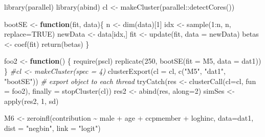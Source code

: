 \documentclass[
]{ctexart}
\newenvironment{Shaded}{\begin{snugshade}}{\end{snugshade}}
\newcommand{\AttributeTok}[1]{\textcolor[rgb]{0.77,0.63,0.00}{#1}}
\newcommand{\CommentTok}[1]{\textcolor[rgb]{0.56,0.35,0.01}{\textit{#1}}}
\newcommand{\ConstantTok}[1]{\textcolor[rgb]{0.00,0.00,0.00}{#1}}
\newcommand{\ControlFlowTok}[1]{\textcolor[rgb]{0.13,0.29,0.53}{\textbf{#1}}}
\newcommand{\DecValTok}[1]{\textcolor[rgb]{0.00,0.00,0.81}{#1}}
\newcommand{\FunctionTok}[1]{\textcolor[rgb]{0.00,0.00,0.00}{#1}}
\newcommand{\NormalTok}[1]{#1}
\newcommand{\OtherTok}[1]{\textcolor[rgb]{0.56,0.35,0.01}{#1}}
\newcommand{\SpecialCharTok}[1]{\textcolor[rgb]{0.00,0.00,0.00}{#1}}
\newcommand{\StringTok}[1]{\textcolor[rgb]{0.31,0.60,0.02}{#1}}
\begin{document}
\begin{Shaded}
\begin{Highlighting}[]
\FunctionTok{library}\NormalTok{(parallel)}
\FunctionTok{library}\NormalTok{(abind)}
\NormalTok{cl }\OtherTok{\textless{}{-}} \FunctionTok{makeCluster}\NormalTok{(parallel}\SpecialCharTok{::}\FunctionTok{detectCores}\NormalTok{())}

\NormalTok{bootSE }\OtherTok{\textless{}{-}} \ControlFlowTok{function}\NormalTok{(fit, data)\{}
\NormalTok{    n }\OtherTok{\textless{}{-}} \FunctionTok{dim}\NormalTok{(data)[}\DecValTok{1}\NormalTok{]}
\NormalTok{    idx }\OtherTok{\textless{}{-}} \FunctionTok{sample}\NormalTok{(}\DecValTok{1}\SpecialCharTok{:}\NormalTok{n, n, }\AttributeTok{replace=}\ConstantTok{TRUE}\NormalTok{)}
\NormalTok{    newData }\OtherTok{\textless{}{-}}\NormalTok{ data[idx,]}
\NormalTok{    fit }\OtherTok{\textless{}{-}} \FunctionTok{update}\NormalTok{(fit, }\AttributeTok{data =}\NormalTok{ newData)}
\NormalTok{    betas }\OtherTok{\textless{}{-}} \FunctionTok{coef}\NormalTok{(fit)}
    \FunctionTok{return}\NormalTok{(betas)}
\NormalTok{\}}

\NormalTok{foo2 }\OtherTok{\textless{}{-}} \ControlFlowTok{function}\NormalTok{() \{}
    \FunctionTok{require}\NormalTok{(pscl)}
    \FunctionTok{replicate}\NormalTok{(}\DecValTok{250}\NormalTok{, }\FunctionTok{bootSE}\NormalTok{(}\AttributeTok{fit =}\NormalTok{ M5, }\AttributeTok{data =}\NormalTok{ dat1))}
\NormalTok{\}}
\CommentTok{\#cl \textless{}{-} makeCluster(spec = 4)}
\FunctionTok{clusterExport}\NormalTok{(}\AttributeTok{cl =}\NormalTok{ cl, }\FunctionTok{c}\NormalTok{(}\StringTok{"M5"}\NormalTok{, }\StringTok{"dat1"}\NormalTok{, }\StringTok{"bootSE"}\NormalTok{)) }\CommentTok{\# export object to each thread}
\FunctionTok{tryCatch}\NormalTok{(res }\OtherTok{\textless{}{-}} \FunctionTok{clusterCall}\NormalTok{(}\AttributeTok{cl=}\NormalTok{cl, }\AttributeTok{fun =}\NormalTok{ foo2), }\AttributeTok{finally =} \FunctionTok{stopCluster}\NormalTok{(cl))}
\NormalTok{res2 }\OtherTok{\textless{}{-}} \FunctionTok{abind}\NormalTok{(res, }\AttributeTok{along=}\DecValTok{2}\NormalTok{)}
\NormalTok{simSes }\OtherTok{\textless{}{-}} \FunctionTok{apply}\NormalTok{(res2, }\DecValTok{1}\NormalTok{, sd)}



\NormalTok{M6 }\OtherTok{\textless{}{-}} \FunctionTok{zeroinfl}\NormalTok{(contribution }\SpecialCharTok{\textasciitilde{}}\NormalTok{ male }\SpecialCharTok{+}\NormalTok{ age }\SpecialCharTok{+}\NormalTok{ ccpmember }\SpecialCharTok{+}\NormalTok{ loghinc, }\AttributeTok{data=}\NormalTok{dat1, }\AttributeTok{dist =} \StringTok{"negbin"}\NormalTok{, }\AttributeTok{link =} \StringTok{"logit"}\NormalTok{)}
\end{Highlighting}
\end{Shaded}
\end{document}
